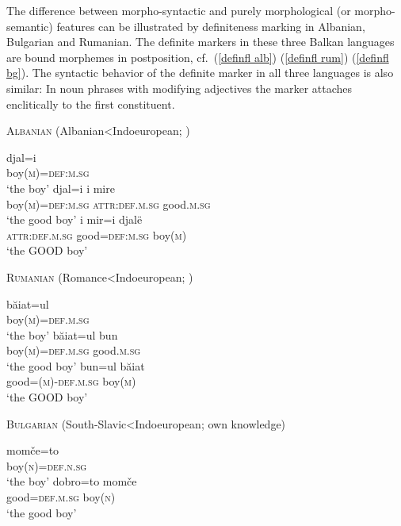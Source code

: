 The difference between morpho-syntactic and purely morphological (or mor\-pho-semantic) features can be illustrated by definiteness marking in Albanian, Bulgarian and Rumanian. The definite markers in these three Balkan languages are bound morphemes in postposition, cf.~(\ref{definfl alb}) (\ref{definfl rum}) (\ref{definfl bg}). The syntactic behavior of the definite marker in all three languages is also similar: In noun phrases with modifying adjectives the marker attaches enclitically to the first constituent. 
\begin{exe}
\ex \textsc{Albanian} (Albanian<Indoeuropean; \citealt{buchholz-etal1987}) 
\begin{xlist}
\ex \label{definfl alb}
\gll	djal=i\\
	boy(\textsc{m})=\textsc{def:m.sg}\\
\glt	‘the boy’
\ex \label{encl alb a}
\gll	djal=i 				i 			mire\\
	boy(\textsc{m})=\textsc{def:m.sg} 	\textsc{attr:def.m.sg}	good.\textsc{m.sg}\\
\glt	‘the good boy’
\ex \label{encl alb b}
\gll	i 			mir=i 			djalë\\
	\textsc{attr:def.m.sg} 	good=\textsc{def:m.sg} 	boy(\textsc{m})\\
\glt	‘the GOOD boy’ 
\end{xlist}
\ex \textsc{Rumanian} (Romance<Indoeuropean; \citealt{beyer-etal1987})
\begin{xlist}
\ex \label{definfl rum}
\gll	băiat=ul\\
	boy(\textsc{m})=\textsc{def.m.sg}\\
\glt	‘the boy’
\ex \label{encl rum a}
\gll	băiat=ul 				bun\\
	boy(\textsc{m})=\textsc{def.m.sg} 	good.\textsc{m.sg}\\
\glt	‘the good boy’
\ex \label{encl rum b}
\gll	bun=ul 					băiat\\
	good=(\textsc{m})-\textsc{def.m.sg} 	boy(\textsc{m})\\
\glt	‘the GOOD boy’
\end{xlist}
\ex \textsc{Bulgarian} (South-Sla\-vic<Indoeuropean; own knowledge)
\begin{xlist}
\ex \label{definfl bg}
\gll	momče=to\\
	boy(\textsc{n})=\textsc{def.n.sg}\\
\glt	‘the boy’
\ex \label{encl bg}
\gll	dobro=to 		momče\\
	good=\textsc{def.m.sg}	boy(\textsc{n})\\
\glt	‘the good boy’
\end{xlist}	
\end{exe}
